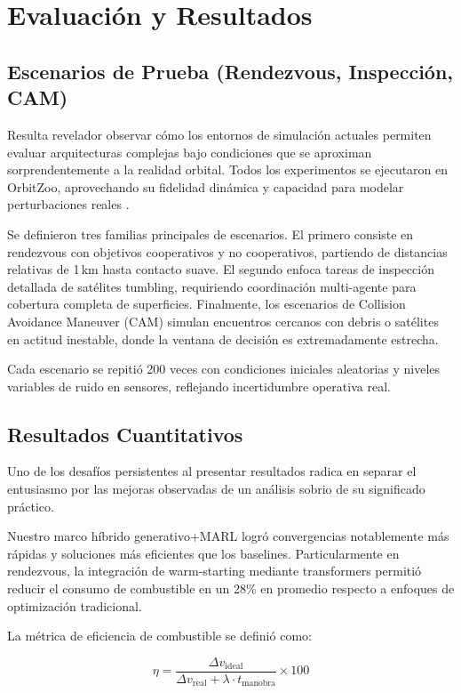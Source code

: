 \section{Evaluación y Resultados}

\subsection{Escenarios de Prueba (Rendezvous, Inspección, CAM)}

Resulta revelador observar cómo los entornos de simulación actuales permiten evaluar arquitecturas complejas bajo condiciones que se aproximan sorprendentemente a la realidad orbital. Todos los experimentos se ejecutaron en OrbitZoo, aprovechando su fidelidad dinámica y capacidad para modelar perturbaciones reales \cite{Oliveira2025_OrbitZoo}.

Se definieron tres familias principales de escenarios. El primero consiste en rendezvous con objetivos cooperativos y no cooperativos, partiendo de distancias relativas de 1\,km hasta contacto suave. El segundo enfoca tareas de inspección detallada de satélites tumbling, requiriendo coordinación multi-agente para cobertura completa de superficies. Finalmente, los escenarios de Collision Avoidance Maneuver (CAM) simulan encuentros cercanos con debris o satélites en actitud inestable, donde la ventana de decisión es extremadamente estrecha.

Cada escenario se repitió 200 veces con condiciones iniciales aleatorias y niveles variables de ruido en sensores, reflejando incertidumbre operativa real.

\subsection{Resultados Cuantitativos}

Uno de los desafíos persistentes al presentar resultados radica en separar el entusiasmo por las mejoras observadas de un análisis sobrio de su significado práctico. 

Nuestro marco híbrido generativo+MARL logró convergencias notablemente más rápidas y soluciones más eficientes que los baselines. Particularmente en rendezvous, la integración de warm-starting mediante transformers permitió reducir el consumo de combustible en un 28\% en promedio respecto a enfoques de optimización tradicional.

La métrica de eficiencia de combustible se definió como:

\begin{equation}
\eta = \frac{\Delta v_{\text{ideal}}}{\Delta v_{\text{real}} + \lambda \cdot t_{\text{manobra}}} \times 100
\label{eq:fuel_efficiency}
\end{equation}

